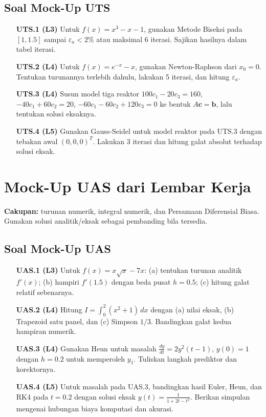 \documentclass[book,english,noindex,lean,nobackpage,nocopyright,noupdate,nofiglist,notablist]{enacom}
\begin{document}
\section*{Soal Mock-Up UTS}
\begin{enumerate}
\item[\textbf{UTS.1 (L3)}] Untuk \(f(x)=x^3-x-1\), gunakan Metode Biseksi pada \([1,1.5]\) sampai \(\varepsilon_a<2\%\) atau maksimal 6 iterasi. Sajikan hasilnya dalam tabel iterasi.
\item[\textbf{UTS.2 (L4)}] Untuk \(f(x)=e^{-x}-x\), gunakan Newton-Raphson dari \(x_0=0\). Tentukan turunannya terlebih dahulu, lakukan 5 iterasi, dan hitung \(\varepsilon_a\).
\item[\textbf{UTS.3 (L4)}] Susun model tiga reaktor \(100c_1-20c_3=160\), \(-40c_1+60c_2=20\), \(-60c_1-60c_2+120c_3=0\) ke bentuk \(A\mathbf{c}=\mathbf{b}\), lalu tentukan solusi eksaknya.
\item[\textbf{UTS.4 (L5)}] Gunakan Gauss-Seidel untuk model reaktor pada UTS.3 dengan tebakan awal \((0,0,0)^T\). Lakukan 3 iterasi dan hitung galat absolut terhadap solusi eksak.
\end{enumerate}


\chapter*{Mock-Up UAS dari Lembar Kerja}
\noindent\textbf{Cakupan:} turunan numerik, integral numerik, dan Persamaan Diferensial Biasa. Gunakan solusi analitik/eksak sebagai pembanding bila tersedia.

\section*{Soal Mock-Up UAS}
\begin{enumerate}
\item[\textbf{UAS.1 (L3)}] Untuk \(f(x)=x\sqrt{x}-7x\): (a) tentukan turunan analitik \(f'(x)\); (b) hampiri \(f'(1.5)\) dengan beda pusat \(h=0.5\); (c) hitung galat relatif sebenarnya.
\item[\textbf{UAS.2 (L4)}] Hitung \(I=\int_0^2 (x^2+1)\,dx\) dengan (a) nilai eksak, (b) Trapezoid satu panel, dan (c) Simpson \(1/3\). Bandingkan galat kedua hampiran numerik.
\item[\textbf{UAS.3 (L4)}] Gunakan Heun untuk masalah \(\frac{dy}{dt}=2y^2(t-1)\), \(y(0)=1\) dengan \(h=0.2\) untuk memperoleh \(y_1\). Tuliskan langkah prediktor dan korektornya.
\item[\textbf{UAS.4 (L5)}] Untuk masalah pada UAS.3, bandingkan hasil Euler, Heun, dan RK4 pada \(t=0.2\) dengan solusi eksak \(y(t)=\frac{1}{1+2t-t^2}\). Berikan simpulan mengenai hubungan biaya komputasi dan akurasi.
\end{enumerate}
\end{document}
